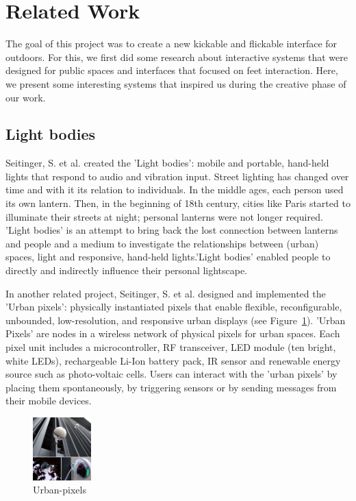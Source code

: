\section{Related Work}
The goal of this project was to create a new kickable and flickable interface for outdoors. For this, we first did some research about interactive systems that were designed for public spaces and interfaces that focused on feet interaction. Here, we present some interesting systems that inspired us during the creative phase of our work.
 
\subsection{Light bodies}
Seitinger, S. et al. \cite{seitinger} created the 'Light bodies': mobile and portable, hand-held lights that respond to audio and vibration input. Street lighting has changed over time and with it its relation to individuals. In the middle ages, each person used its own lantern. Then, in the beginning of 18th century, cities like Paris started to illuminate their streets at night; personal lanterns were not longer required. 'Light bodies' is an attempt to bring back the lost connection between lanterns and people and a medium to investigate the relationships between (urban) spaces, light and responsive, hand-held lights.'Light bodies' enabled people to directly and indirectly influence their personal lightscape.

In another related project, Seitinger, S. et al. \cite{seitinger-2} designed and implemented the 'Urban pixels': physically instantiated pixels that enable flexible, reconfigurable, unbounded, low-resolution, and responsive urban displays (see Figure~\ref{fig:urban-pixels}). 'Urban Pixels' are nodes in a wireless network of physical pixels for urban spaces. Each pixel unit includes a microcontroller, RF transceiver, LED module (ten bright, white LEDs), rechargeable Li-Ion battery pack, IR sensor and renewable energy source such as photo-voltaic cells. Users can interact with the 'urban pixels' by placing them spontaneously, by triggering sensors or by sending messages from their mobile devices. 

\begin{figure}[h!]
	\centering
	\includegraphics[width=0.2\textwidth, clip=true, keepaspectratio=true]{./pic/urban-pixels.png}
	\caption{Urban-pixels}
	\label{fig:urban-pixels}
\end{figure}

